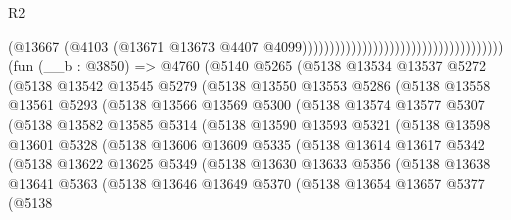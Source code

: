 \begin{lexlean}{R2}
\begin{coremodule}
                                                                        (@13667
                                                                          (@4103
                                                                            (@13671
                                                                              @13673
                                                                              @4407
                                                                              @4099)))))))))))))))))))))))))))))))))))))
    (fun (__b : @3850) =>
    @4760
      (@5140
        @5265
        (@5138
          @13534
          @13537
          @5272
          (@5138
            @13542
            @13545
            @5279
            (@5138
              @13550
              @13553
              @5286
              (@5138
                @13558
                @13561
                @5293
                (@5138
                  @13566
                  @13569
                  @5300
                  (@5138
                    @13574
                    @13577
                    @5307
                    (@5138
                      @13582
                      @13585
                      @5314
                      (@5138
                        @13590
                        @13593
                        @5321
                        (@5138
                          @13598
                          @13601
                          @5328
                          (@5138
                            @13606
                            @13609
                            @5335
                            (@5138
                              @13614
                              @13617
                              @5342
                              (@5138
                                @13622
                                @13625
                                @5349
                                (@5138
                                  @13630
                                  @13633
                                  @5356
                                  (@5138
                                    @13638
                                    @13641
                                    @5363
                                    (@5138
                                      @13646
                                      @13649
                                      @5370
                                      (@5138
                                        @13654
                                        @13657
                                        @5377
                                        (@5138

\end{coremodule}
\end{lexlean}
